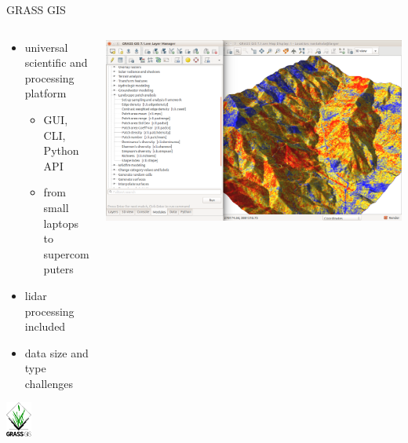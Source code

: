 \documentclass[xcolor={dvipsnames,usenames},beamer,aspectratio=169]{beamer}
\begin{document}
\begin{frame}{GRASS GIS}

\begin{columns}
\begin{column}{0.4\textwidth}

\begin{itemize}
  \item universal scientific and processing platform
  \begin{itemize}
  \item GUI, CLI, Python API
  \item from small laptops to supercomputers
  \end{itemize}
  \item lidar processing included
  \item data size and type challenges
\end{itemize}

\begin{center}
\includegraphics[width=0.3\textwidth]{logos/grass_gis}
\end{center}

\end{column}
\begin{column}{0.55\textwidth}

\begin{center}
  \includegraphics[width=\textwidth]{grass/count_and_modules}
\end{center}

\end{column}
\end{columns}

\end{frame}
\end{document}
